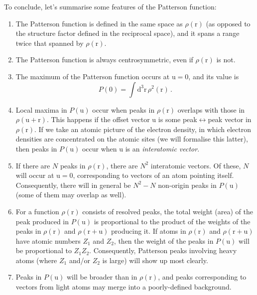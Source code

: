 \documentclass{article}
\theoremstyle{plain}\theoremheaderfont{\normalfont\itshape}\theorembodyfont{\rmfamily}\theoremseparator{.}\newtheorem*{rem}{Remark}\newtheorem*{ex}{Example}\newtheorem*{proof}{Proof}\newtheorem*{altp}{Alternative proof}
\theoremstyle{plain}\theoremheaderfont{\normalfont\bfseries}\theorembodyfont{\rmfamily}\theoremseparator{.}\newtheorem{thm}{Theorem}[section]\newtheorem{lem}[thm]{Lemma}\newtheorem{prop}[thm]{Proposition}\newtheorem*{cor}{Corollary}\newtheorem{defn}[thm]{Definition}\newtheorem{clm}[thm]{Claim}\newtheorem{clminproof}{Claim}\newtheorem*{law}{Law}\newtheorem{pos}[thm]{Postulate}
\theoremstyle{break}\theoremheaderfont{\normalfont\itshape}\theorembodyfont{\rmfamily}\theoremseparator{.\medskip}\newtheorem*{proofskip}{Proof}\newtheorem*{exs}{Examples}\newtheorem*{rems}{Remarks}
\theoremstyle{break}\theoremheaderfont{\normalfont\bfseries}\theorembodyfont{\rmfamily}\theoremseparator{.\medskip}\newtheorem{lemskip}[thm]{Lemma}\newtheorem{defnskip}[thm]{Definition}\newtheorem{propskip}[thm]{Proposition}\newtheorem{thmskip}[thm]{Theorem}
\numberwithin{equation}{section}
\newcommand{\dd}[2][]{\mathrm{d}^{#1} #2\,}
\newcommand{\vb}[1]{\bm{\mathrm{#1}}}
\begin{document}
    To conclude, let's summarise some features of the Patterson function:
    \begin{enumerate}[topsep=0pt]
        \item The Patterson function is defined in the same space as \(\rho(\vb{r})\) (as opposed to the structure factor defined in the reciprocal space), and it spans a range twice that spanned by \(\rho(\vb{r})\).
        \item The Patterson function is always centrosymmetric, even if \(\rho(\vb{r})\) is not.
        \item The maximum of the Patterson function occurs at \(\vb{u}=\vb{0}\), and its value is
        \begin{equation}
            P(\vb{0})=\int\dd[3]{\vb{r}}\rho^2(\vb{r})\,.
        \end{equation}
        \item Local maxima in \(P(\vb{u})\) occur when peaks in \(\rho(\vb{r})\) overlaps with those in \(\rho(\vb{u}+\vb{r})\). This happens if the offset vector \(\vb{u}\) is some peak\(\leftrightarrow\)peak vector in \(\rho(\vb{r})\). If we take an atomic picture of the electron density, in which electron densities are concentrated on the atomic sites (we will formalise this latter), then peaks in \(P(\vb{u})\) occur when \(\vb{u}\) is an \textit{interatomic vector}.
        \item If there are \(N\) peaks in \(\rho(\vb{r})\), there are \(N^2\) interatomic vectors. Of these, \(N\) will occur at \(\vb{u}=\vb{0}\), corresponding to vectors of an atom pointing itself. Consequently, there will in general be \(N^2-N\) non-origin peaks in \(P(\vb{u})\) (some of them may overlap as well).
        \item For a function \(\rho(\vb{r})\) consists of resolved peaks, the total weight (area) of the peak produced in \(P(\vb{u})\) is proportional to the product of the weights of the peaks in \(\rho(\vb{r})\) and \(\rho(\vb{r}+\vb{u})\) producing it. If atoms in \(\rho(\vb{r})\) and \(\rho(\vb{r}+\vb{u})\) have atomic numbers \(Z_1\) and \(Z_2\), then the weight of the peaks in \(P(\vb{u})\) will be proportional to \(Z_1 Z_2\). Consequently, Patterson peaks involving heavy atoms (where \(Z_1\) and/or \(Z_2\) is large) will show up most clearly.
        \item Peaks in \(P(\vb{u})\) will be broader than in \(\rho(\vb{r})\), and peaks corresponding to vectors from light atoms may merge into a poorly-defined background.
    \end{enumerate}
\end{document}
